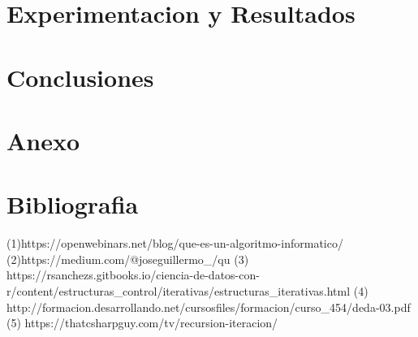 \documentclass[spanish]{article}
\begin{document}
	\section{Experimentacion y Resultados}
	\section{Conclusiones}
	\section{Anexo}
	\section{Bibliografia}
	(1)https://openwebinars.net/blog/que-es-un-algoritmo-informatico/
	(2)https://medium.com/@joseguillermo_/qu%
	(3) https://rsanchezs.gitbooks.io/ciencia-de-datos-con-r/content/estructuras_control/iterativas/estructuras_iterativas.html
	(4) http://formacion.desarrollando.net/cursosfiles/formacion/curso_454/deda-03.pdf
	(5) https://thatcsharpguy.com/tv/recursion-iteracion/
\end{document}
